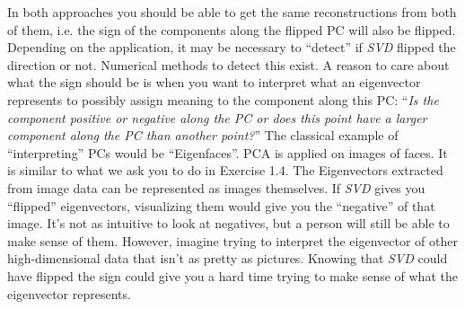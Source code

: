 \begin{frame}
\begin{itemize}
{In both approaches you should be able to get the same reconstructions from both of them, i.e. the sign of the components along the flipped PC will also be flipped. Depending on the application, it may be necessary to ``detect'' if \textit{SVD} flipped the direction or not. Numerical methods to detect this exist. A reason to care about what the sign should be is when you want to interpret what an eigenvector represents to possibly assign meaning to the component along this PC: ``\textit{Is the component positive or negative along the PC or does this point have a larger component along the PC than another point?}''
The classical example of ``interpreting'' PCs would be ``Eigenfaces''. PCA is applied on images of faces. It is similar to what we ask you to do in Exercise 1.4. The Eigenvectors extracted from image data can be represented as images themselves. If \textit{SVD} gives you ``flipped'' eigenvectors, visualizing them would give you the ``negative'' of that image. It's not as intuitive to look at negatives, but a person will still be able to make sense of them. However, imagine trying to interpret the eigenvector of other high-dimensional data that isn't as pretty as pictures. Knowing that \textit{SVD} could have flipped the sign could give you a hard time trying to make sense of what the eigenvector represents.

}

\end{itemize}

\end{frame}

